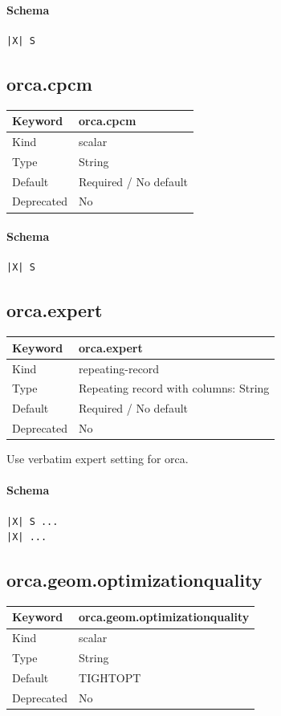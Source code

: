 \documentclass[11pt]{article}
\begin{document}
{{{{{\paragraph{Schema}
\begin{Verbatim}
|X| S
\end{Verbatim}

\subsection{orca.cpcm}
\label{kw:orca-cpcm}
\begin{longtable}{|p{1.5in}|p{4.5in}|}
\hline
Keyword & orca.cpcm \\
\hline
Kind & scalar \\
\hline
Type & String \\
\hline
Default & Required / No default \\
\hline
Deprecated & No \\
\hline
\end{longtable}
\paragraph{Schema}
\begin{Verbatim}
|X| S
\end{Verbatim}

\subsection{orca.expert}
\label{kw:orca-expert}
\begin{longtable}{|p{1.5in}|p{4.5in}|}
\hline
Keyword & orca.expert \\
\hline
Kind & repeating-record \\
\hline
Type & Repeating record with columns: String \\
\hline
Default & Required / No default \\
\hline
Deprecated & No \\
\hline
\end{longtable}
 Use verbatim expert setting for orca.

\paragraph{Schema}
\begin{Verbatim}
|X| S ...
|X| ...
\end{Verbatim}

\subsection{orca.geom.optimizationquality}
\label{kw:orca-geom-optimizationquality}
\begin{longtable}{|p{1.5in}|p{4.5in}|}
\hline
Keyword & orca.geom.optimizationquality \\
\hline
Kind & scalar \\
\hline
Type & String \\
\hline
Default & TIGHTOPT \\
\hline
Deprecated & No \\
\hline
\end{longtable}
}}}}}
\end{document}
